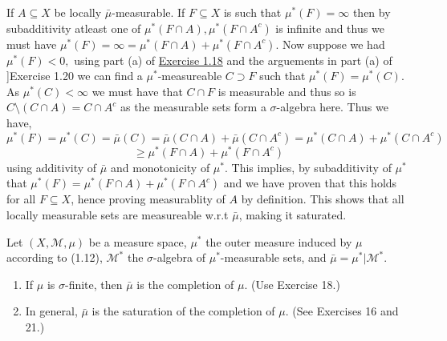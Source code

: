 \documentclass[12pt,a4paper]{article}
\begin{document}
\begin{solution}
    If $A\subseteq X$ be locally $\bar{\mu}$-measurable. 
    If $F\subseteq X$ is such that $\mu^*(F)=\infty$ then by subadditivity atleast one of $\mu^*(F\cap A),\mu^*(F\cap A^c)$ is infinite and thus we must have $\mu^*(F)=\infty=\mu^*(F\cap A)+\mu^*(F\cap A^c)$. 
    Now suppose we had $\mu^*(F)<0,$ using part (a) of \hyperref[prob:1-18]{Exercise 1.18} and the arguements in part (a) of \hyperref[prob:1-20]]{Exercise 1.20} we can find a $\mu^*$-measureable $C\supset F$ such that $\mu^*(F)=\mu^*(C)$.
    As $\mu^*(C)<\infty$ we must have that $C\cap F$ is measurable and thus so is $C\setminus(C\cap A)=C\cap A^c$ as the measurable sets form a $\sigma$-algebra here. 
    Thus we have,
    $$\mu^*(F)=\mu^*(C)=\bar{\mu}(C)=\bar{\mu}(C\cap A)+\bar{\mu}(C\cap A^c)=\mu^*(C\cap A)+\mu^*(C\cap A^c)$$
    $$\geq\mu^*(F\cap A)+\mu^*(F\cap A^c)$$
    using additivity of $\bar{\mu}$ and monotonicity of $\mu^*$.
    This implies, by subadditivity of $\mu^*$ that $\mu^*(F)=\mu^*(F\cap A)+\mu^*(F\cap A^c)$ and we have proven that this holds for all $F\subseteq X$, hence proving measurablity of $A$ by definition. 
    This shows that all locally measurable sets are measureable w.r.t $\bar{\mu}$, making it saturated. 
\end{solution}
\begin{problem}\label{prob:1-22}
Let $(X, \mathcal{M}, \mu)$ be a measure space, $\mu^*$ the outer measure induced by $\mu$ according to (1.12), $\mathcal{M}^*$ the $\sigma$-algebra of $\mu^*$-measurable sets, and $\bar{\mu} = \mu^*|\mathcal{M}^*$.
\begin{enumerate}[label=\alph*.]
    \item If $\mu$ is $\sigma$-finite, then $\bar{\mu}$ is the completion of $\mu$. (Use Exercise 18.)
    \item In general, $\bar{\mu}$ is the saturation of the completion of $\mu$. (See Exercises 16 and 21.)
\end{enumerate}
\end{problem}
\end{document}
